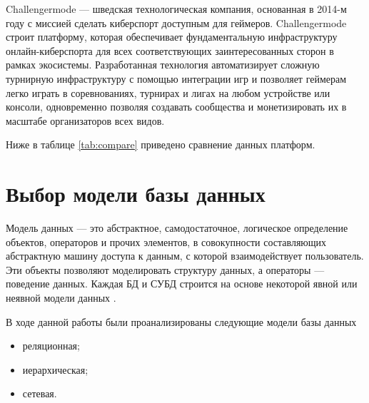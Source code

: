 
Challengermode — шведская технологическая компания, основанная в 2014-м году с миссией сделать киберспорт доступным для геймеров. Challengermode строит платформу, которая обеспечивает фундаментальную инфраструктуру онлайн-киберспорта для всех соответствующих заинтересованных сторон в рамках экосистемы. 
Разработанная технология автоматизирует сложную турнирную инфраструктуру с помощью интеграции игр и позволяет геймерам легко играть в соревнованиях, турнирах и лигах на любом устройстве или консоли, одновременно позволяя создавать сообщества и монетизировать их в масштабе организаторов всех видов.


Ниже в таблице \ref{tab:compare} приведено сравнение данных платформ.

\begin{table}[H]
	\caption{Анализ аналогичных решений}
	\label{tab:compare}
	\centering
\end{table}

\section{Выбор модели базы данных}
Модель данных — это абстрактное, самодостаточное, логическое определение объектов, операторов и прочих элементов, в совокупности составляющих абстрактную машину доступа к данным, с которой взаимодействует пользователь. Эти объекты позволяют моделировать структуру данных, а операторы — поведение данных. Каждая БД и СУБД строится на основе некоторой явной или неявной модели данных \cite{Deit book}.

В ходе данной работы были проанализированы следующие модели базы данных
\begin{itemize}
	\item реляционная;
	\item иерархическая;
	\item сетевая.
\end{itemize}

